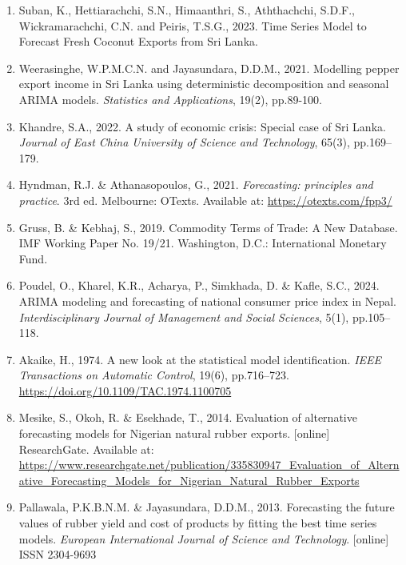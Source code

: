 \documentclass[12pt,a4paper]{report} %
\begin{document}
\begin{enumerate}
		\item Suban, K., Hettiarachchi, S.N., Himaanthri, S., Aththachchi, S.D.F., Wickramarachchi,
		C.N. and Peiris, T.S.G., 2023. Time Series Model to Forecast Fresh Coconut Exports
		from Sri Lanka.
		
		\item Weerasinghe, W.P.M.C.N. and Jayasundara, D.D.M., 2021. Modelling pepper export
		income in Sri Lanka using deterministic decomposition and seasonal ARIMA models.
		\textit{Statistics and Applications}, 19(2), pp.89-100.
		
		\item Khandre, S.A., 2022. A study of economic crisis: Special case of Sri Lanka. 
		\textit{Journal of East China University of Science and Technology}, 65(3), pp.169–179.
		
		\item Hyndman, R.J. \& Athanasopoulos, G., 2021. \textit{Forecasting: principles and practice}. 3rd ed. Melbourne: OTexts. Available at: \url{https://otexts.com/fpp3/}
		
		\item Gruss, B. \& Kebhaj, S., 2019. Commodity Terms of Trade: A New Database. IMF Working Paper No. 19/21. Washington, D.C.: International Monetary Fund.
		
		\item Poudel, O., Kharel, K.R., Acharya, P., Simkhada, D. \& Kafle, S.C., 2024. ARIMA modeling and forecasting of national consumer price index in Nepal. \textit{Interdisciplinary Journal of Management and Social Sciences}, 5(1), pp.105--118.
		
		\item Akaike, H., 1974. A new look at the statistical model identification. \textit{IEEE Transactions on Automatic Control}, 19(6), pp.716--723. \url{https://doi.org/10.1109/TAC.1974.1100705}
		
		\item Mesike, S., Okoh, R. \& Esekhade, T., 2014. Evaluation of alternative forecasting models for Nigerian natural rubber exports. [online] ResearchGate. Available at: \url{https://www.researchgate.net/publication/335830947_Evaluation_of_Alternative_Forecasting_Models_for_Nigerian_Natural_Rubber_Exports}
		
		\item Pallawala, P.K.B.N.M. \& Jayasundara, D.D.M., 2013. Forecasting the future values of rubber yield and cost of products by fitting the best time series models. \textit{European International Journal of Science and Technology}. [online] ISSN 2304-9693
		

\end{enumerate}
\end{document}
